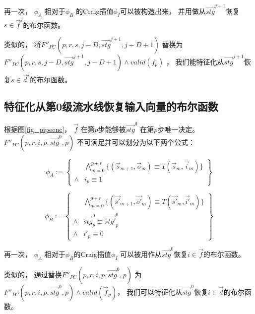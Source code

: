 再一次，
$\phi_A$ 相对于$\phi_B$ 的Craig插值$\phi_I$可以被构造出来，
并用做从$\vec{stg}^{j+1}$恢复$s\in\vec{f}^{j}$的布尔函数。

类似的，
将$F''_{PC}(p,r,s,j-D,\vec{stg}^{j+1},j-D+1)$  替换为
$F''_{PC}(p,r,s,j-D,\vec{stg}^{j+1},j-D+1)\wedge valid(f_p)$ ，
我们能特征化从$\vec{stg}^{j+1}$恢复$s\in\vec{d}^{j}$的布尔函数。

\subsection{特征化从第0级流水线恢复输入向量的布尔函数}

根据图\ref{fig_pipeenc}，
$\vec{f}$ 在第$p$步能够被$\vec{stg}^0$ 在第$p$步唯一决定。
$F''_{PC}(p,r,i,p,\vec{stg}^0,p)$ 不可满足并可以划分为以下两个公式：

\begin{equation}
\phi_A:=
\left\{
\begin{array}{cc}
&\bigwedge_{m=0}^{p+r}
\{
(\vec{s}_{m+1},\vec{o}_m)\equiv T(\vec{s}_m,\vec{i}_m)
\}
\\
\wedge& i_{p}\equiv 1
\end{array}
\right\}
\end{equation}

\begin{equation}
\phi_B:=
\left\{
\begin{array}{cc}
&\bigwedge_{m=0}^{p+r}
\{
(\vec{s'}_{m+1},\vec{o'}_m)\equiv T(\vec{s'}_m,\vec{i'}_m)
\}
\\
\wedge&\vec{stg}^0_p\equiv \vec{stg'}^0_p \\
\wedge& i'_{p}\equiv 0
\end{array}
\right\}
\end{equation}

再一次，
$\phi_A$ 相对于$\phi_B$的Craig插值$\phi_I$
可以被用作从$\vec{stg}^0$恢复$i\in\vec{f}$的布尔函数。

类似的，
通过替换$F''_{PC}(p,r,i,p,\vec{stg}^0,p)$ 为$F''_{PC}(p,r,i,p,\vec{stg}^0,p)\wedge valid(\vec{f}_p)$，
我们可以特征化从$\vec{stg}^0$恢复$i\in\vec{d}$的布尔函数。



